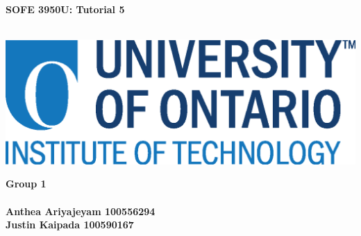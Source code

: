 \documentclass[11pt]{article}
\author{Justin Kaipada}
\date{\today}
\title{}
\begin{document}

\thispagestyle{empty} %
\begin{center}
  {\Huge\textbf{SOFE 3950U: Tutorial 5}\par}
  \vspace{20mm}\\
  \includegraphics[scale=1.5]{uoit_logo.png}
  \vspace{40mm}\\
  \begin{large}
      \textbf{Group 1}\\
      \vspace{10mm}\\
      \textbf{Anthea Ariyajeyam 100556294}\\
      \textbf{Justin Kaipada 100590167}
  \end{large}
\end{center}
\newpage
\end{document}

